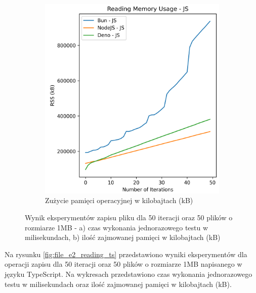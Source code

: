 \begin{figure}[H]
  \begin{subfigure}[b]{0.42\textwidth}
    \centering
    \includegraphics[width=\textwidth]{Figures/files/files_writing_50_2000_50_js_memory.png}
    \caption{Zużycie pamięci operacyjnej w kilobajtach (kB)}
    \label{fig:file_e2_writing_js_memory}
  \end{subfigure}
  \caption{Wynik eksperymentów zapisu pliku dla 50 iteracji oraz 50 plików o rozmiarze 1MB - a) czas wykonania jednorazowego testu w milisekundach, b) ilość zajmowanej pamięci w kilobajtach (kB)}
  \label{fig:file_e2_writing_js}
\end{figure}

Na rysunku \ref{fig:file_e2_reading_ts} przedstawiono wyniki eksperymentów dla operacji zapisu dla 50 iteracji oraz 50 plików o rozmiarze 1MB napisanego w języku TypeScript. Na wykresach przedstawiono czas wykonania jednorazowego testu w milisekundach oraz ilość zajmowanej pamięci w kilobajtach (kB).


